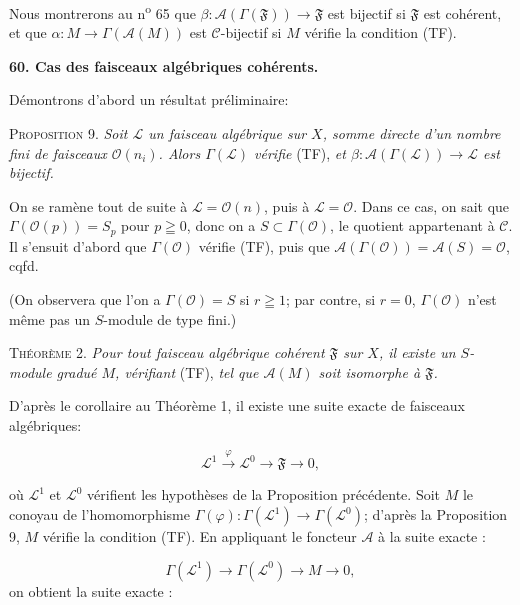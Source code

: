 Nous montrerons au n\textsuperscript{o} 65 que $\beta : \mathcal{A}(\Gamma(\mathfrak{F})) \to \mathfrak{F}$ est bijectif si $\mathfrak{F}$ est cohérent, et que $\alpha : M \to \Gamma(\mathcal{A}(M))$ est $\mathcal{C}$-bijectif si $M$ vérifie la condition (TF).


\textbf{60. Cas des faisceaux algébriques cohérents.}

Démontrons d'abord un résultat préliminaire:

\textsc{Proposition} 9. \textit{Soit $\mathcal{L}$ un faisceau algébrique sur $X$, somme directe d'un nombre fini de faisceaux $\mathcal{O}(n_{i})$. Alors $\Gamma(\mathcal{L})$ vérifie} (TF), \textit{et $\beta : \mathcal{A}(\Gamma(\mathcal{L})) \to \mathcal{L}$ est bijectif.}

On se ramène tout de suite à $\mathcal{L} = \mathcal{O}(n)$, puis à $\mathcal{L} = \mathcal{O}$. Dans ce cas, on sait que $\Gamma(\mathcal{O}(p)) = S_{p}$ pour $p \geqq 0$, donc on a $S \subset \Gamma(\mathcal{O})$, le quotient appartenant à $\mathcal{C}$. Il s'ensuit d'abord que $\Gamma(\mathcal{O})$ vérifie (TF), puis que $\mathcal{A}(\Gamma(\mathcal{O})) = \mathcal{A}(S) = \mathcal{O}$, cqfd.

(On observera que l'on a $\Gamma(\mathcal{O}) = S$ si $r \geqq 1$; par contre, si $r = 0$, $\Gamma(\mathcal{O})$ n'est même pas un $S$-module de type fini.)

\textsc{Théorème} 2. \textit{Pour tout faisceau algébrique cohérent $\mathfrak{F}$ sur $X$, il existe un $S$-module gradué $M$, vérifiant} (TF), \textit{tel que $\mathcal{A}(M)$ soit isomorphe à $\mathfrak{F}$.}

D'après le corollaire au Théorème 1, il existe une suite exacte de faisceaux algébriques:

\begin{equation*}
\mathcal{L}^{1} \stackrel{\varphi}{\longrightarrow} \mathcal{L}^{0} \to \mathfrak{F} \to 0,
\end{equation*}


 où $\mathcal{L}^1$ et $\mathcal{L}^0$ vérifient les hypothèses de la Proposition précédente. Soit $M$ le conoyau de l'homomorphisme $\Gamma(\varphi): \Gamma(\mathcal{L}^1) \to \Gamma(\mathcal{L}^0)$; d'après la Proposition 9, $M$ vérifie la condition (TF). En appliquant le foncteur $\mathcal{A}$ à la suite exacte :

\begin{equation*}
\Gamma(\mathcal{L}^1) \to \Gamma(\mathcal{L}^0) \to M \to 0,
\end{equation*}
on obtient la suite exacte :

